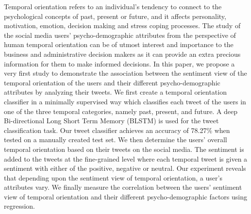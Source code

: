Temporal orientation refers to an individual's tendency to connect to the psychological concepts of past, present or future, and it affects personality, motivation, emotion, decision making and stress coping processes. The study of the social media users' psycho-demographic attributes from the perspective of human temporal orientation can be of utmost interest and importance to the business and administrative decision makers as it can provide an extra precious information for them to make informed decisions. In this paper, we propose a very first study to demonstrate the association between the sentiment view of the temporal orientation of the users and their different psycho-demographic attributes by analyzing their tweets. We first create a temporal orientation classifier in a minimally supervised way which classifies each tweet of the users in one of the three temporal categories, namely past, present, and future. A deep Bi-directional Long Short Term Memory (BLSTM) is used for the tweet classification task. Our tweet classifier achieves an accuracy of 78.27\% when tested on a manually created test set. We then determine the users' overall temporal orientation based on their tweets on the social media. The sentiment is added to the tweets at the fine-grained level where each temporal tweet is given a sentiment with either of the positive, negative or neutral. Our experiment reveals that depending upon the sentiment view of temporal orientation, a user's attributes vary. We finally measure the correlation between the users' sentiment view of temporal orientation and their different psycho-demographic factors using regression.
